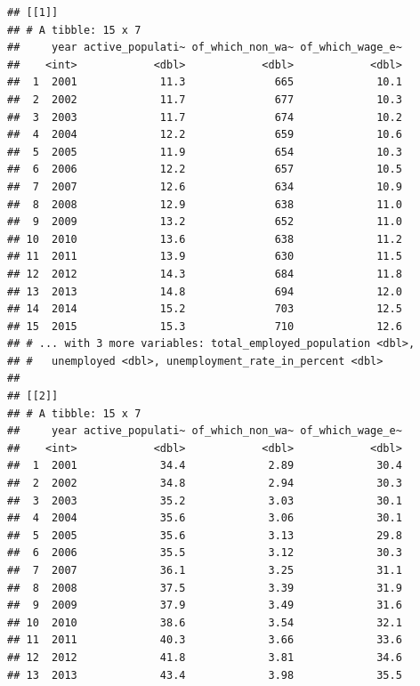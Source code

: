 \documentclass[]{gitbook}
\newenvironment{Shaded}{\begin{snugshade}}{\end{snugshade}}
\newcommand{\KeywordTok}[1]{\textcolor[rgb]{0.13,0.29,0.53}{\textbf{#1}}}
\newcommand{\NormalTok}[1]{#1}
\newcommand{\OperatorTok}[1]{\textcolor[rgb]{0.81,0.36,0.00}{\textbf{#1}}}
\newcommand{\StringTok}[1]{\textcolor[rgb]{0.31,0.60,0.02}{#1}}
\theoremstyle{definition}
\theoremstyle{definition}
\theoremstyle{definition}
\theoremstyle{remark}
\begin{document}
\begin{Shaded}
\end{Shaded}

\begin{verbatim}
## [[1]]
## # A tibble: 15 x 7
##     year active_populati~ of_which_non_wa~ of_which_wage_e~
##    <int>            <dbl>            <dbl>            <dbl>
##  1  2001             11.3              665             10.1
##  2  2002             11.7              677             10.3
##  3  2003             11.7              674             10.2
##  4  2004             12.2              659             10.6
##  5  2005             11.9              654             10.3
##  6  2006             12.2              657             10.5
##  7  2007             12.6              634             10.9
##  8  2008             12.9              638             11.0
##  9  2009             13.2              652             11.0
## 10  2010             13.6              638             11.2
## 11  2011             13.9              630             11.5
## 12  2012             14.3              684             11.8
## 13  2013             14.8              694             12.0
## 14  2014             15.2              703             12.5
## 15  2015             15.3              710             12.6
## # ... with 3 more variables: total_employed_population <dbl>,
## #   unemployed <dbl>, unemployment_rate_in_percent <dbl>
## 
## [[2]]
## # A tibble: 15 x 7
##     year active_populati~ of_which_non_wa~ of_which_wage_e~
##    <int>            <dbl>            <dbl>            <dbl>
##  1  2001             34.4             2.89             30.4
##  2  2002             34.8             2.94             30.3
##  3  2003             35.2             3.03             30.1
##  4  2004             35.6             3.06             30.1
##  5  2005             35.6             3.13             29.8
##  6  2006             35.5             3.12             30.3
##  7  2007             36.1             3.25             31.1
##  8  2008             37.5             3.39             31.9
##  9  2009             37.9             3.49             31.6
## 10  2010             38.6             3.54             32.1
## 11  2011             40.3             3.66             33.6
## 12  2012             41.8             3.81             34.6
## 13  2013             43.4             3.98             35.5

\end{verbatim}
\end{document}
